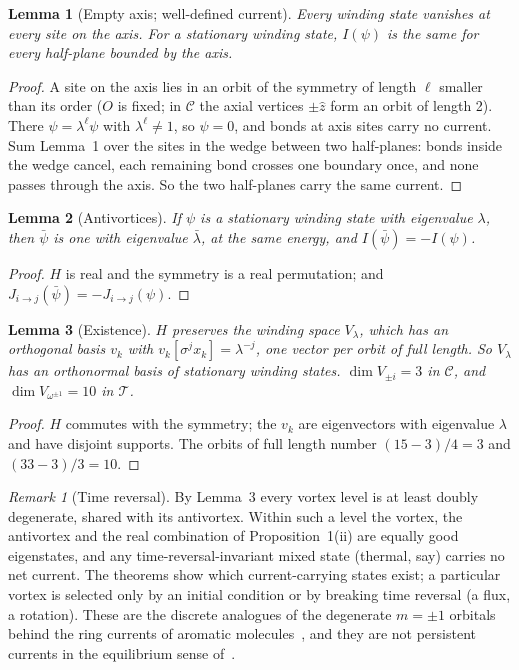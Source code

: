 \documentclass[twocolumn]{iopjournal}
\newtheorem{lemma}{Lemma}
\theoremstyle{definition}
\theoremstyle{remark}
\newtheorem*{remark}{Remark}
\begin{document}
\begin{lemma}[Empty axis; well-defined current]
\label{lem:axis}
Every winding state vanishes at every site on the axis. For a
stationary winding state, $I(\psi)$ is the same for every half-plane
bounded by the axis.
\end{lemma}

\begin{proof}
A site on the axis lies in an orbit of the symmetry of length $\ell$
smaller than its order ($O$ is fixed; in $\mathcal C$ the axial
vertices $\pm\hat z$ form an orbit of length 2). There
$\psi = \lambda^\ell\psi$ with $\lambda^\ell \neq 1$, so $\psi = 0$,
and bonds at axis sites carry no current. Sum Lemma~1 over the sites
in the wedge between two half-planes: bonds inside the wedge cancel,
each remaining bond crosses one boundary once, and none passes through
the axis. So the two half-planes carry the same current.
\end{proof}

\begin{lemma}[Antivortices]
If $\psi$ is a stationary winding state with eigenvalue $\lambda$, then
$\bar\psi$ is one with eigenvalue $\bar\lambda$, at the same energy, and
$I(\bar\psi) = -I(\psi)$.
\end{lemma}

\begin{proof}
$H$ is real and the symmetry is a real permutation; and
$J_{i\to j}(\bar\psi) = -J_{i\to j}(\psi)$.
\end{proof}

\begin{lemma}[Existence]
$H$ preserves the winding space $V_\lambda$, which has an orthogonal
basis $v_k$ with $v_k[\sigma^jx_k] = \lambda^{-j}$, one vector per orbit
of full length. So $V_\lambda$ has an orthonormal basis of stationary
winding states. $\dim V_{\pm i} = 3$ in $\mathcal C$, and
$\dim V_{\omega^{\pm1}} = 10$ in $\mathcal T$.
\end{lemma}

\begin{proof}
$H$ commutes with the symmetry; the $v_k$ are eigenvectors with
eigenvalue $\lambda$ and have disjoint supports. The orbits of full
length number $(15-3)/4 = 3$ and $(33-3)/3 = 10$.
\end{proof}

\begin{remark}[Time reversal]
By Lemma~3 every vortex level is at least doubly degenerate, shared
with its antivortex. Within such a level the vortex, the antivortex
and the real combination of Proposition~1(ii) are equally good
eigenstates, and any time-reversal-invariant mixed state (thermal,
say) carries no net current. The theorems show which current-carrying
states exist; a particular vortex is selected only by an initial
condition or by breaking time reversal (a flux, a rotation). These are
the discrete analogues of the degenerate $m = \pm1$ orbitals behind
the ring currents of aromatic molecules~\cite{London1937,Pople1956,
SteinerFowler2001}, and they are not persistent currents in the
equilibrium sense of~\cite{BIL1983}.
\end{remark}
\end{document}
